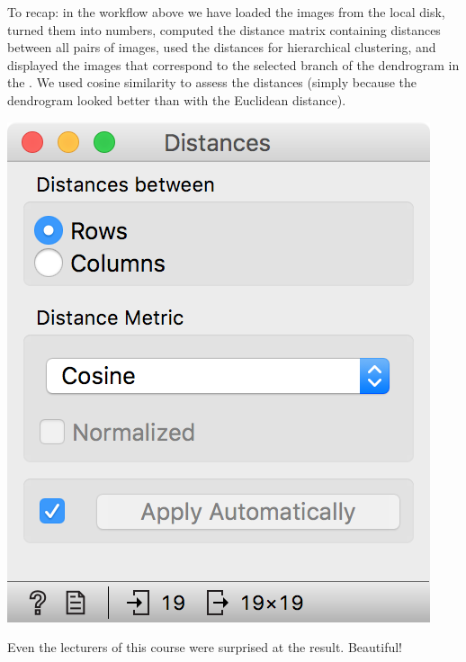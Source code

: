 To recap: in the workflow above we have loaded the images from the local disk, turned them into numbers, computed the distance matrix containing distances between all pairs of images, used the distances for hierarchical clustering, and displayed the images that correspond to the selected branch of the dendrogram in the . We used cosine similarity to assess the distances (simply because the dendrogram looked better than with the Euclidean distance).

\begin{marginfigure}
    \centering
    \includegraphics[scale=0.6]{distances.png}
    \caption{$\;$}
\end{marginfigure}

\newpage

Even the lecturers of this course were surprised at the result. Beautiful!

